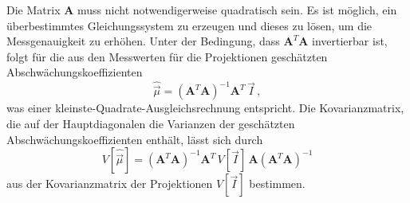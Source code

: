 Die Matrix $\symbf{A}$ muss nicht notwendigerweise quadratisch sein. Es ist möglich, ein überbestimmtes Gleichungssystem zu erzeugen und dieses zu lösen, um die Messgenauigkeit zu erhöhen. Unter der Bedingung, dass $\symbf{A}^T \symbf{A}$ invertierbar ist, folgt für die aus den Messwerten für die Projektionen geschätzten Abschwächungskoeffizienten
\begin{equation}
	\hat{\vec{\mu}} = (\symbf{A}^T \symbf{A})^{-1} \symbf{A}^T \, \vec{I}\,,
	\label{eqn:mumatrix}
\end{equation}
was einer kleinste-Quadrate-Ausgleichsrechnung entspricht.
Die Kovarianzmatrix, die auf der Hauptdiagonalen die Varianzen der geschätzten Abschwächungskoeffizienten enthält, lässt sich durch
\begin{equation}
	V[\hat{\vec{\mu}}] = (\symbf{A}^T \symbf{A})^{-1} \symbf{A}^T \, V[\vec{I}] \, \symbf{A} (\symbf{A}^T \symbf{A})^{-1}
\end{equation}
aus der Kovarianzmatrix der Projektionen $V[\vec{I}]$ bestimmen.
